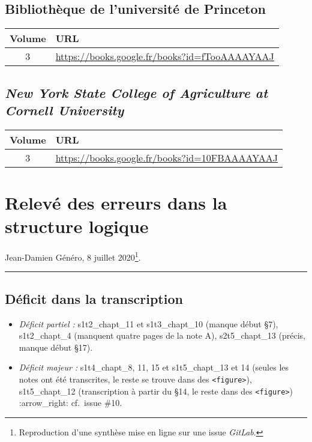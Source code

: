 \subsection{Bibliothèque de l'université de Princeton}
\begin{center}
\begin{tabular}{ | c | p{13cm} | }
\hline
Volume & URL \\ \hline
3 & \url{https://books.google.fr/books?id=fTooAAAAYAAJ} \\ \hline
\end{tabular}
\end{center}

\subsection{\textit{New York State College of Agriculture at Cornell University}}
\begin{center}
\begin{tabular}{ | c | p{13cm} | }
\hline
Volume & URL \\ \hline
3 & \url{https://books.google.fr/books?id=10FBAAAAYAAJ} \\ \hline
\end{tabular}
\end{center}

\clearpage

\section{Relevé des erreurs dans la structure
logique}\label{relevuxe9-des-erreurs-dans-la-structure-logique}

Jean-Damien Généro, 8 juillet 2020\footnote{Reproduction d'une synthèse mise en ligne sur une issue \textit{GitLab}.}.

\begin{center}\rule{3in}{0.4pt}\end{center}

\subsection{Déficit dans la
transcription}\label{duxe9ficit-dans-la-transcription}

\begin{itemize}
\item
  \emph{Déficit partiel :} s1t2\_chapt\_11 et s1t3\_chapt\_10 (manque
  début §7), s1t2\_chapt\_4 (manquent quatre pages de la note A),
  s2t5\_chapt\_13 (précis, manque début §17).
\item
  \emph{Déficit majeur :} s1t4\_chapt\_8, 11, 15 et s1t5\_chapt\_13 et
  14 (seules les notes ont été transcrites, le reste se trouve dans des
  \texttt{\textless{}figure\textgreater{}}), s1t5\_chapt\_12
  (transcription à partir du §14, le reste dans des
  \texttt{\textless{}figure\textgreater{}}) :arrow\_right: cf.~issue
  \#10.
\end{itemize}

